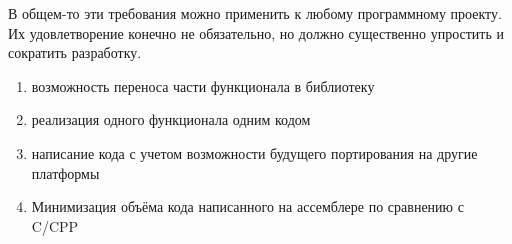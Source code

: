 В общем-то эти требования можно применить к любому программному проекту.
Их удовлетворение конечно не обязательно, но должно существенно
упростить и сократить разработку.

\begin{enumerate}
\item{возможность переноса части функционала в библиотеку}
\item{реализация одного функционала одним кодом}
\item{написание кода с учетом возможности будущего портирования на другие платформы}
\item{Минимизация объёма кода написанного на ассемблере по сравнению с C/CPP}
\end{enumerate}
